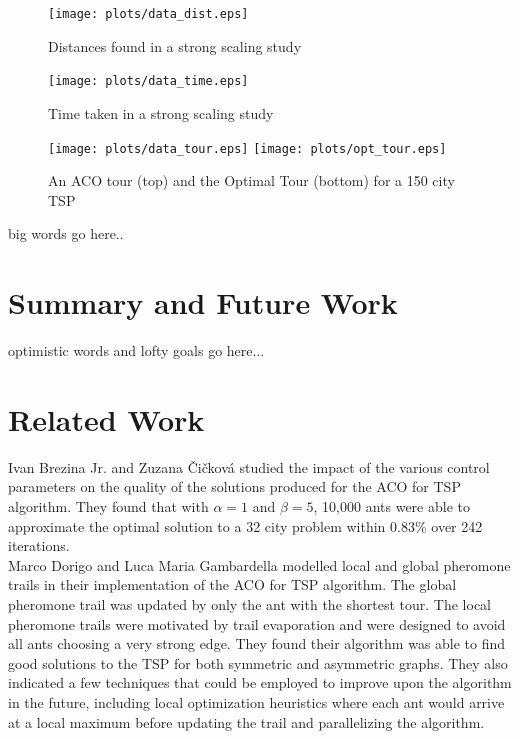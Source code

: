 \documentclass[twocolumn]{article}
\begin{document}
\begin{figure}
  \centering
  \texttt{[image: plots/data\_dist.eps]}
  \caption{Distances found in a strong scaling study} \label{fig:dist}
\end{figure}

\begin{figure}
  \centering
  \texttt{[image: plots/data\_time.eps]}
  \caption{Time taken in a strong scaling study} \label{fig:time}
\end{figure}

\begin{figure}
  \centering
  \texttt{[image: plots/data\_tour.eps]}
  \texttt{[image: plots/opt\_tour.eps]}
  \caption{An ACO tour (top) and the Optimal Tour (bottom) for a 150 city TSP} 
  \label{fig:tours}
\end{figure}

big words go here..\\


\section{Summary and Future Work}

optimistic words and lofty goals go here...\\

\section{Related Work}

Ivan Brezina Jr. and Zuzana \v{C}i\v{c}kov\'{a} \cite{mis:aco} studied the 
impact of the various control parameters on the quality of the solutions 
produced for the ACO for TSP algorithm. They found that with $\alpha=1$ and 
$\beta=5$, 10,000 ants were able to approximate the optimal solution to a 32 city
problem within 0.83\% over 242 iterations. \\

Marco Dorigo and Luca Maria Gambardella \cite{iridia:aco} modelled local and 
global pheromone trails in their implementation of the ACO for TSP algorithm. 
The global pheromone trail was updated by only the ant with the shortest tour. 
The local pheromone trails were motivated by trail evaporation and were designed
to avoid all ants choosing a very strong edge. They found their algorithm was 
able to find good solutions to the TSP for both symmetric and asymmetric graphs.
They also indicated a few techniques that could be employed to improve upon the 
algorithm in the future, including local optimization heuristics where each ant 
would arrive at a local maximum before updating the trail and parallelizing the
algorithm. \\
\end{document}
